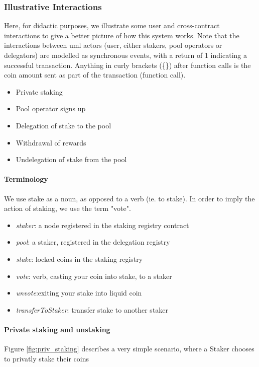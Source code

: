 \subsubsection{Illustrative Interactions}

Here, for didactic purposes, we illustrate some user and cross-contract interactions to give a better picture of how this system works. Note that the interactions between uml actors (user, either stakers, pool operators or delegators) are modelled as synchronous events, with a return of 1 indicating a successful transaction. Anything in curly brackets (\{\}) after function calls is the coin amount sent as part of the transaction (function call).

\begin{itemize}
    \item Private staking
    \item Pool operator signs up
    \item Delegation of stake to the pool
    \item Withdrawal of rewards
    \item Undelegation of stake from the pool
\end{itemize}

\paragraph{Terminology}
We use stake as a noun, as opposed to a verb (ie. to stake). In order to imply the action of staking, we use the term "vote". 
\begin{itemize}
    \item \textit{staker}: a node registered in the staking registry contract 
    \item \textit{pool}: a staker, registered in the delegation registry
    \item \textit{stake}: locked coins in the staking registry
    \item \textit{vote}: verb, casting your coin into stake, to a staker
    \item \textit{unvote}:exiting your stake into liquid coin
    \item \textit{transferToStaker}: transfer stake to another staker
\end{itemize}

\paragraph{Private staking and unstaking}
Figure \ref{fig:priv_staking} describes a very simple scenario, where a Staker chooses to privatly stake their coins 

